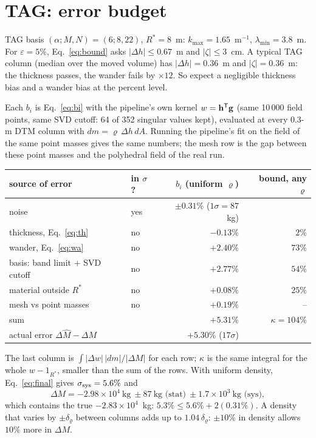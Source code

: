 \documentclass[11pt]{article}
\begin{document}
\section*{TAG: error budget}
TAG basis $(\alpha;M,N)=(6;8,22)$, $R^*=8$~m: $k_{\max}=1.65$~m$^{-1}$,
$\lambda_{\min}=3.8$~m. For $\varepsilon=5\%$, Eq.~\eqref{eq:bound} asks
$|\Delta h|\le0.67$~m and $|\zeta|\le3$~cm. A typical TAG column (median over
the moved volume) has $|\Delta h|=0.36$~m and $|\zeta|=0.36$~m: the thickness
passes, the wander fails by $\times12$. So expect a negligible thickness bias
and a wander bias at the percent level.

Each $b_i$ is Eq.~\eqref{eq:bi} with the pipeline's own kernel
$w=\mathbf h^{\sf T}\mathbf g$ (same 10\,000 field points, same SVD cutoff:
64 of 352 singular values kept), evaluated at every $0.3$-m DTM column with
$dm=\varrho\,\Delta h\,dA$. Running the pipeline's fit on the field of the same
point masses gives the same numbers; the mesh row is the gap between these
point masses and the polyhedral field of the real run.
\par{\centering\small
\begin{tabular}{llrr}
\toprule
source of error & in $\sigma$? & $b_i$ (uniform $\varrho$) & bound, any $\varrho$\\
\midrule
noise & yes & $\pm0.31\%$ ($1\sigma=87$~kg) & \\
thickness, Eq.~\eqref{eq:th} & no & $-0.13\%$ & $2\%$\\
wander, Eq.~\eqref{eq:wa} & no & $+2.40\%$ & $73\%$\\
basis: band limit $+$ SVD cutoff & no & $+2.77\%$ & $54\%$\\
material outside $R^*$ & no & $+0.08\%$ & $25\%$\\
mesh vs point masses & no & $+0.19\%$ & --\\
\midrule
sum & & $+5.31\%$ & $\kappa=104\%$\\
actual error $\Delta\hat M-\Delta M$ & & $+5.30\%$ ($17\sigma$) & \\
\bottomrule
\end{tabular}\par}
\smallskip
The last column is $\int|\Delta w|\,|dm|/|\Delta M|$ for each row; $\kappa$ is
the same integral for the whole $w-1_{R^*}$, smaller than the sum of the rows.
With uniform density, Eq.~\eqref{eq:final} gives $\sigma_{\rm sys}=5.6\%$ and
\begin{equation}
  \Delta M=-2.98\times10^4~\text{kg}\ \pm87~\text{kg (stat)}\ \pm1.7\times10^3~\text{kg (sys)},
\end{equation}
which contains the true $-2.83\times10^4$~kg: $5.3\%\le5.6\%+2(0.31\%)$. A
density that varies by $\pm\delta_\varrho$ between columns adds up to
$1.04\,\delta_\varrho$: $\pm10\%$ in density allows $10\%$ more in $\Delta M$.
\end{document}
